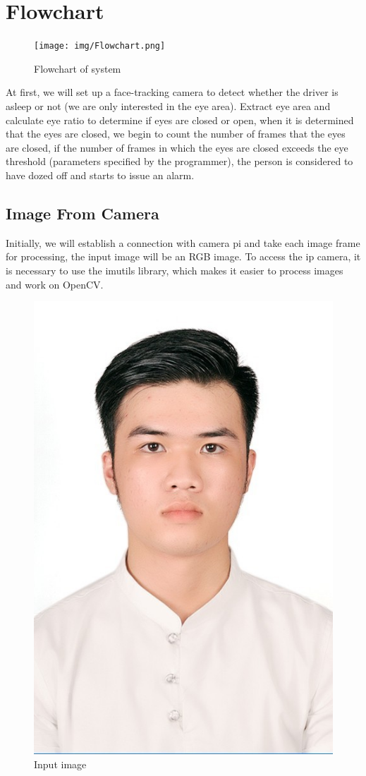 \section{Flowchart}
    \begin{figure}[H]
        \centering
        \texttt{[image: img/Flowchart.png]}
        \caption{Flowchart of system}
    \end{figure}
    At first, we will set up a face-tracking camera to detect whether the driver is asleep or not (we are only interested in the eye area). 
    Extract eye area and calculate eye ratio to determine if eyes are closed or open, when it is determined that the eyes are closed, we 
    begin to count the number of frames that the eyes are closed, if the number of frames in which the eyes are closed exceeds the eye 
    threshold (parameters specified by the programmer), the person is considered to have dozed off and starts to issue an alarm.

    \subsection{Image From Camera}
    Initially, we will establish a connection with camera pi and take each image frame for processing, the input image will be an RGB image. 
    To access the ip camera, it is necessary to use the imutils library, which makes it easier to process images and work on OpenCV.
    \begin{figure}[H]
        \centering
        \includegraphics[width=0.6\linewidth]{img/1.JPG}
        \caption{Input image}
    \end{figure}

